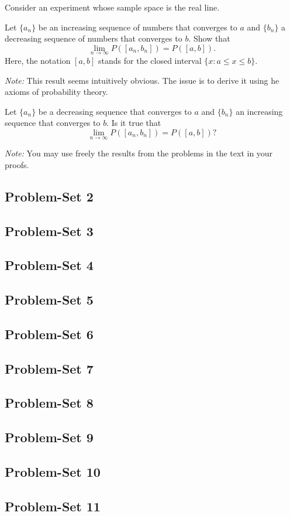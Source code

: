 \begin{problem}
  Consider an experiment whose sample space is the real line.
  \begin{alphlist}
  \item Let \(\{a_n\}\) be an increasing sequence of numbers that converges
    to \(a\) and \(\{b_n\}\) a decreasing sequence of numbers that
    converges to \(b\). Show that
    \[
      \lim_{n\to\infty} P([a_n,b_n])=P([a,b]).
    \]
    Here, the notation \([a,b]\) stands for the closed interval \(\{x:a\leq
    x\leq b\}\).

    \noindent\emph{Note:} This result seems intuitively obvious. The issue is to
    derive it using he axioms of probability theory.
  \item Let \(\{a_n\}\) be a decreasing sequence that converges to \(a\)
    and \(\{b_n\}\) an increasing sequence that converges to \(b\). Is it
    true that
    \[
      \lim_{n\to\infty} P([a_n,b_n])=P([a,b])?
    \]

    \noindent\emph{Note:} You may use freely the results from the problems
    in the text in your proofs.
  \end{alphlist}
\end{problem}
\begin{solution*}
\end{solution*}

\subsection{Problem-Set 2}
\subsection{Problem-Set 3}
\subsection{Problem-Set 4}
\subsection{Problem-Set 5}
\subsection{Problem-Set 6}
\subsection{Problem-Set 7}
\subsection{Problem-Set 8}
\subsection{Problem-Set 9}
\subsection{Problem-Set 10}
\subsection{Problem-Set 11}

